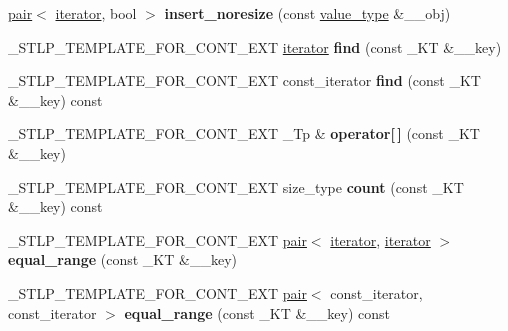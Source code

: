 \begin{DoxyCompactItemize}
\item 
\mbox{\label{classhash__map_a0cb952c6aa5f1059e46afced03f88d57}} 
\hyperlink{structpair}{pair}$<$ \hyperlink{structiterator}{iterator}, bool $>$ {\bfseries insert\+\_\+noresize} (const \hyperlink{structpair}{value\+\_\+type} \&\+\_\+\+\_\+obj)
\item 
\mbox{\label{classhash__map_a07e25a4223a361c37f3e7f6a1c0d2e32}} 
\+\_\+\+S\+T\+L\+P\+\_\+\+T\+E\+M\+P\+L\+A\+T\+E\+\_\+\+F\+O\+R\+\_\+\+C\+O\+N\+T\+\_\+\+E\+XT \hyperlink{structiterator}{iterator} {\bfseries find} (const \+\_\+\+KT \&\+\_\+\+\_\+key)
\item 
\mbox{\label{classhash__map_a26e4841559e801faa4860ef50d50df03}} 
\+\_\+\+S\+T\+L\+P\+\_\+\+T\+E\+M\+P\+L\+A\+T\+E\+\_\+\+F\+O\+R\+\_\+\+C\+O\+N\+T\+\_\+\+E\+XT const\+\_\+iterator {\bfseries find} (const \+\_\+\+KT \&\+\_\+\+\_\+key) const
\item 
\mbox{\label{classhash__map_a122dc43f138c976c2f6da0202b31a57c}} 
\+\_\+\+S\+T\+L\+P\+\_\+\+T\+E\+M\+P\+L\+A\+T\+E\+\_\+\+F\+O\+R\+\_\+\+C\+O\+N\+T\+\_\+\+E\+XT \+\_\+\+Tp \& {\bfseries operator\mbox{[}$\,$\mbox{]}} (const \+\_\+\+KT \&\+\_\+\+\_\+key)
\item 
\mbox{\label{classhash__map_ad832e58ce8955cf9e8240f76af3ffa26}} 
\+\_\+\+S\+T\+L\+P\+\_\+\+T\+E\+M\+P\+L\+A\+T\+E\+\_\+\+F\+O\+R\+\_\+\+C\+O\+N\+T\+\_\+\+E\+XT size\+\_\+type {\bfseries count} (const \+\_\+\+KT \&\+\_\+\+\_\+key) const
\item 
\mbox{\label{classhash__map_a2b33ded9de6373a4dcdebe544a39268f}} 
\+\_\+\+S\+T\+L\+P\+\_\+\+T\+E\+M\+P\+L\+A\+T\+E\+\_\+\+F\+O\+R\+\_\+\+C\+O\+N\+T\+\_\+\+E\+XT \hyperlink{structpair}{pair}$<$ \hyperlink{structiterator}{iterator}, \hyperlink{structiterator}{iterator} $>$ {\bfseries equal\+\_\+range} (const \+\_\+\+KT \&\+\_\+\+\_\+key)
\item 
\mbox{\label{classhash__map_ae2f12caa03dca5473c3ed87931824997}} 
\+\_\+\+S\+T\+L\+P\+\_\+\+T\+E\+M\+P\+L\+A\+T\+E\+\_\+\+F\+O\+R\+\_\+\+C\+O\+N\+T\+\_\+\+E\+XT \hyperlink{structpair}{pair}$<$ const\+\_\+iterator, const\+\_\+iterator $>$ {\bfseries equal\+\_\+range} (const \+\_\+\+KT \&\+\_\+\+\_\+key) const

\end{DoxyCompactItemize}

